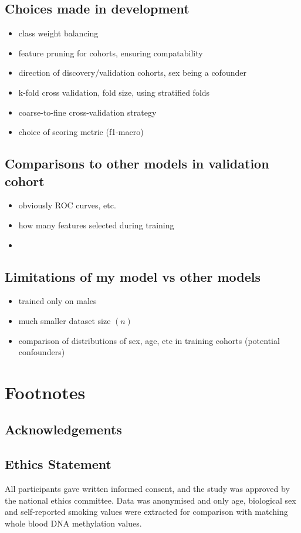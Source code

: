 \documentclass{article}
\begin{document}
\subsection*{Choices made in development}
\begin{itemize}
    \item class weight balancing
    \item feature pruning for cohorts, ensuring compatability
    \item direction of discovery/validation cohorts, sex being a cofounder
    \item k-fold cross validation, fold size, using stratified folds
    \item coarse-to-fine cross-validation strategy
    \item choice of scoring metric (f1-macro)
\end{itemize}

\subsection*{Comparisons to other models in validation cohort}
\begin{itemize}
    \item obviously ROC curves, etc.
    \item how many features selected during training
    \item
\end{itemize}

\subsection*{Limitations of my model vs other models}
\begin{itemize}
    \item trained only on males
    \item much smaller dataset size \((n)\)
    \item comparison of distributions of sex, age, etc in training cohorts (potential confounders)
\end{itemize}

\section{Footnotes}

\subsection{Acknowledgements}

\subsection{Ethics Statement}
All participants gave written informed consent, and the study was approved by the national ethics committee. Data was anonymised and only age, biological sex and self-reported smoking values were extracted for comparison with matching whole blood DNA methylation values.

\printbibliography
\end{document}
